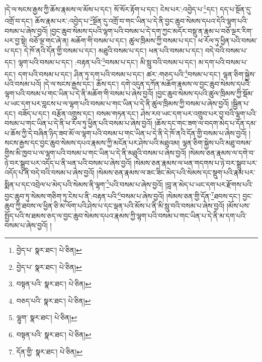 །དེ་ལ་སངས་རྒྱས་ཀྱི་ཆོས་རྣམས་ལ་མོས་པ་དང་། སོ་སོར་རྟོག་པ་དང་། ངེས་པར་:འབྱེད་པ་\footnote{བྱེད་པ་  སྣར་ཐང་།  པེ་ཅིན། }དང་། དད་པ་སྔོན་དུ་འགྲོ་བ་དང་། ཆོས་རྣམ་པར་:འབྱེད་པ་\footnote{བྱེད་པ་  སྣར་ཐང་།  པེ་ཅིན། }སྔོན་དུ་འགྲོ་བ་གང་ཡིན་པ་དེ་ནི་བྱང་ཆུབ་སེམས་དཔའ་དེའི་ལྷག་པའི་བསམ་པ་ཞེས་བྱའོ། །བྱང་ཆུབ་སེམས་དཔའི་ལྷག་པའི་བསམ་པ་དེ་དག་ཀྱང་མདོར་བསྡུ་ན་རྣམ་པ་བཅོ་ལྔར་རིག་པར་བྱ་སྟེ། བཅོ་ལྔ་གང་ཞེ་ན། མཆོག་གི་བསམ་པ་དང་། ཚུལ་ཁྲིམས་ཀྱི་བསམ་པ་དང་། ཕ་རོལ་ཏུ་ཕྱིན་པའི་བསམ་པ་དང་། དེ་ཁོ་ནའི་དོན་གྱི་བསམ་པ་དང་། མཐུའི་བསམ་པ་དང་། ཕན་པའི་བསམ་པ་དང་། བདེ་བའི་བསམ་པ་དང་། ལྷག་པའི་བསམ་པ་དང་། :བརྟན་པའི་\footnote{བསྟན་པའི་  སྣར་ཐང་།  པེ་ཅིན། }བསམ་པ་དང་། མི་སླུ་བའི་བསམ་པ་དང་། མ་དག་པའི་བསམ་པ་དང་། དག་པའི་བསམ་པ་དང་། ཤིན་ཏུ་དག་པའི་བསམ་པ་དང་། ཚར་:གཅད་པའི་\footnote{བཅད་པའི་  སྣར་ཐང་།  པེ་ཅིན། }བསམ་པ་དང་། ལྷན་ཅིག་སྐྱེས་པའི་བསམ་པའོ། །དེ་ལ་སངས་རྒྱས་དང་། ཆོས་དང་། དགེ་འདུན་དཀོན་མཆོག་རྣམས་ལ་བྱང་ཆུབ་སེམས་དཔའི་ལྷག་པའི་བསམ་པ་གང་ཡིན་པ་དེ་ནི་མཆོག་གི་བསམ་པ་ཞེས་བྱའོ། །བྱང་ཆུབ་སེམས་དཔའི་ཚུལ་ཁྲིམས་ཀྱི་སྡོམ་པ་ཡང་དག་པར་བླངས་པ་ལ་ལྷག་པའི་བསམ་པ་གང་ཡིན་པ་དེ་ནི་ཚུལ་ཁྲིམས་ཀྱི་བསམ་པ་ཞེས་བྱའོ། །སྦྱིན་པ་དང་། བཟོད་པ་དང་། བརྩོན་འགྲུས་དང་། བསམ་གཏན་དང་། ཤེས་རབ་ཡང་དག་པར་འགྲུབ་པར་བྱ་བའི་ལྷག་པའི་བསམ་པ་གང་ཡིན་པ་དེ་ནི་ཕ་རོལ་ཏུ་ཕྱིན་པའི་བསམ་པ་ཞེས་བྱའོ། །ཆོས་དང་གང་ཟག་ལ་བདག་མེད་པ་དོན་དམ་པ་ཆོས་ཀྱི་དེ་བཞིན་ཉིད་ཟབ་མོ་ལ་ལྷག་པའི་བསམ་པ་གང་ཡིན་པ་དེ་ནི་དེ་ཁོ་ནའི་དོན་གྱི་བསམ་པ་ཞེས་བྱའོ། །སངས་རྒྱས་དང་བྱང་ཆུབ་སེམས་དཔའ་རྣམས་ཀྱི་མངོན་པར་ཤེས་པའི་མཐུའམ། ལྷན་ཅིག་སྐྱེས་པའི་མཐུ་བསམ་གྱིས་མི་ཁྱབ་པ་ལ་ལྷག་པའི་བསམ་པ་གང་ཡིན་པ་དེ་ནི་མཐུའི་བསམ་པ་ཞེས་བྱའོ། །སེམས་ཅན་རྣམས་ལ་དགེ་བ་ཉེ་བར་སྒྲུབ་པར་འདོད་པ་ནི་ཕན་པའི་བསམ་པ་ཞེས་བྱའོ། །སེམས་ཅན་རྣམས་ལ་ཕན་གདགས་པ་ཉེ་བར་སྒྲུབ་པར་འདོད་པ་ནི་བདེ་བའི་བསམ་པ་ཞེས་བྱའོ། །སེམས་ཅན་རྣམས་ལ་ཟང་ཟིང་མེད་པའི་སེམས་དང་སྡུག་པའི་རྣམ་པར་སྨིན་པ་དང་འབྲེལ་པ་མེད་པའི་སེམས་ནི་ལྷག་\footnote{ལྷུག་  སྣར་ཐང་།  པེ་ཅིན། }པའི་བསམ་པ་ཞེས་བྱའོ། །བླ་ན་མེད་པ་ཡང་དག་པར་རྫོགས་པའི་བྱང་ཆུབ་ཏུ་སེམས་གཅིག་ཏུ་ངེས་པ་ནི་:བརྟན་པའི་\footnote{བསྟན་པའི་  སྣར་ཐང་།  པེ་ཅིན། }བསམ་པ་ཞེས་བྱའོ། །སེམས་ཅན་གྱི་དོན་\footnote{དོན་གྱི་  སྣར་ཐང་།  པེ་ཅིན། }ཐབས་དང་། བྱང་ཆུབ་ཀྱི་ཐབས་ལ་ཕྱིན་ཅི་མ་ལོག་པའི་ཤེས་པ་དང་ལྡན་པའི་མོས་པ་ནི་མི་སླུ་བའི་བསམ་པ་ཞེས་བྱའོ། །མོས་པས་སྤྱོད་པའི་ས་ཐམས་ཅད་ལ་བྱང་ཆུབ་སེམས་དཔའ་རྣམས་ཀྱི་ལྷག་པའི་བསམ་པ་གང་ཡིན་པ་དེ་ནི་མ་དག་པའི་བསམ་པ་ཞེས་བྱའོ། །
